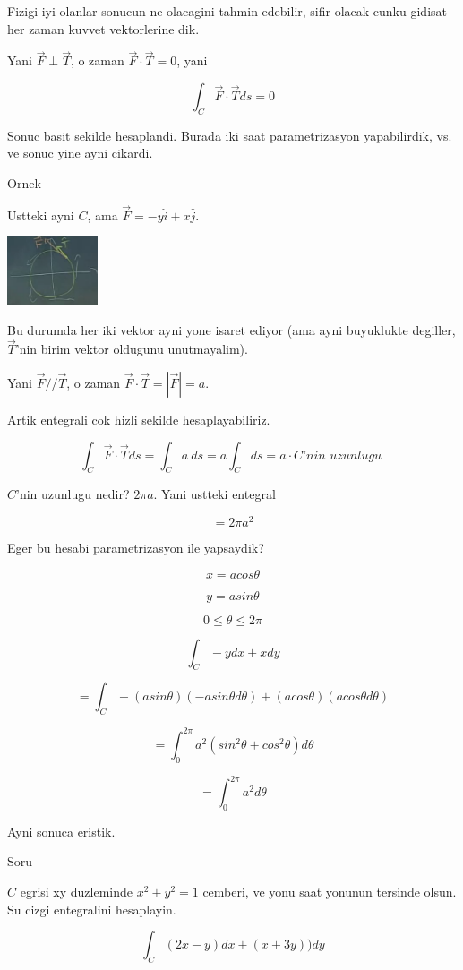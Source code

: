 \documentclass[12pt,fleqn]{article}
\begin{document}
Fizigi iyi olanlar sonucun ne olacagini tahmin edebilir, sifir olacak cunku
gidisat her zaman kuvvet vektorlerine dik. 

Yani $\vec{F} \perp \vec{T}$, o zaman $\vec{F} \cdot \vec{T} = 0$, yani

\[  \int_C \vec{F} \cdot \vec{T} ds = 0\]

Sonuc basit sekilde hesaplandi. Burada iki saat parametrizasyon
yapabilirdik, vs. ve sonuc yine ayni cikardi. 

Ornek

Ustteki ayni $C$, ama $\vec{F} = -y\hat{i} + x\hat{j}$. 

\includegraphics[height=2cm]{19_14.png}

Bu durumda her iki vektor ayni yone isaret ediyor (ama ayni buyuklukte
degiller, $\vec{T}$'nin birim vektor oldugunu unutmayalim). 

Yani $\vec{F} // \vec{T}$, o zaman $\vec{F} \cdot \vec{T} = |\vec{F}| =
a$.

Artik entegrali cok hizli sekilde hesaplayabiliriz. 

\[  \int_C \vec{F} \cdot \vec{T} ds 
=  \int_C a \ ds 
= a  \int_C ds 
= a \cdot C \textit{'nin uzunlugu }
\]

$C$'nin uzunlugu nedir? $2\pi a$. Yani ustteki entegral

\[ = 2\pi a^2 \]

Eger bu hesabi parametrizasyon ile yapsaydik? 

\[ x = acos\theta \]

\[ y = asin\theta \]

\[ 0 \le \theta \le 2\pi \]

\[ \int_C -y dx + x dy \]


\[ = \int_C -(asin\theta)(-asin\theta d\theta) + 
(acos\theta)(a cos\theta d\theta)
\]

\[ = \int_0^{2\pi} a^2 (sin^2\theta + cos^2\theta)d\theta \]

\[ = \int_0^{2\pi} a^2 d\theta \]

Ayni sonuca eristik. 

Soru 

$C$ egrisi xy duzleminde $x^2+y^2=1$ cemberi, ve yonu saat yonunun tersinde
olsun. Su cizgi entegralini hesaplayin.

\[ \int_C (2x-y)dx + (x+3y))dy \]
\end{document}
